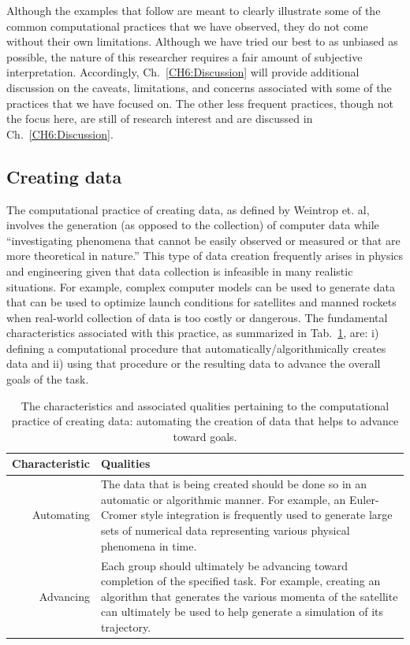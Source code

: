\documentclass{msuphddissertation}
\begin{document}
\begin{doublespace}
Although the examples that follow are meant to clearly illustrate some of the common computational practices that we have observed, they do not come without their own limitations.  Although we have tried our best to as unbiased as possible, the nature of this researcher requires a fair amount of subjective interpretation.  Accordingly, Ch.~\ref{CH6:Discussion} will provide additional discussion on the caveats, limitations, and concerns associated with some of the practices that we have focused on.  The other less frequent practices, though not the focus here, are still of research interest and are discussed in Ch.~\ref{CH6:Discussion}.

%
%
%
%
%
%
%
%
%
%
%
%
%
%
%
%

\subsection{Creating data}\label{CH5:SecCreatingData}

The computational practice of creating data, as defined by Weintrop et. al, involves the generation (as opposed to the collection) of computer data while ``investigating phenomena that cannot be easily observed or measured or that are more theoretical in nature.''  This type of data creation frequently arises in physics and engineering given that data collection is infeasible in many realistic situations.  For example, complex computer models can be used to generate data that can be used to optimize launch conditions for satellites and manned rockets when real-world collection of data is too costly or dangerous.  The fundamental characteristics associated with this practice, as summarized in Tab.~\ref{CH5:CreatingData}, are: i) defining a computational procedure that automatically/algorithmically creates data and ii) using that procedure or the resulting data to advance the overall goals of the task.

\begin{table}[t]
\begin{tabular}{r|p{}}
Characteristic & Qualities \\\hline\hline
Automating & The data that is being created should be done so in an automatic or algorithmic manner.  For example, an Euler-Cromer style integration is frequently used to generate large sets of numerical data representing various physical phenomena in time.\\
Advancing & Each group should ultimately be advancing toward completion of the specified task.  For example, creating an algorithm that generates the various momenta of the satellite can ultimately be used to help generate a simulation of its trajectory.\\
\end{tabular}\caption{The characteristics and associated qualities pertaining to the computational practice of creating data: automating the creation of data that helps to advance toward goals.}\label{CH5:CreatingData}
\end{table}


\end{doublespace}
\end{document}

